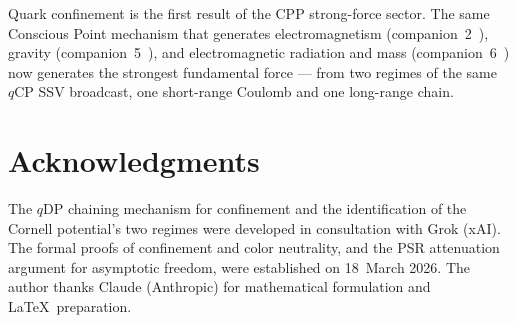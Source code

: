 \documentclass[12pt]{article}
\newcommand{\qCP}{q\mathrm{CP}}
\newcommand{\qDP}{q\mathrm{DP}}
\begin{document}
Quark confinement is the first result of the CPP strong-force sector.
The same Conscious Point mechanism that generates electromagnetism
(companion~2~\cite{c2}), gravity (companion~5~\cite{c5}), and
electromagnetic radiation and mass (companion~6~\cite{c6}) now
generates the strongest fundamental force — from two regimes of
the same $\qCP$ SSV broadcast, one short-range Coulomb and one
long-range chain.

\section*{Acknowledgments}

The $\qDP$ chaining mechanism for confinement and the identification
of the Cornell potential's two regimes were developed in consultation
with Grok (xAI). The formal proofs of confinement and color
neutrality, and the PSR attenuation argument for asymptotic freedom,
were established on 18~March 2026. The author thanks Claude (Anthropic)
for mathematical formulation and \LaTeX\ preparation.
\end{document}
